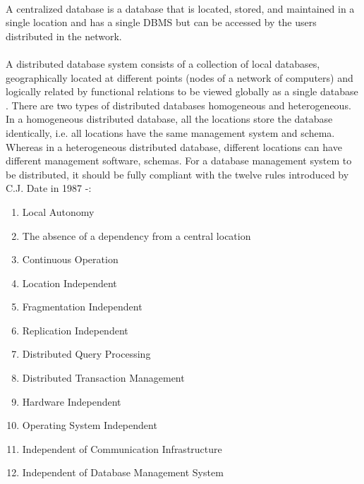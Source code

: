 \documentclass[12pt]{article}
\begin{document}
        \paragraph{}
        A centralized database is a database that is located, stored, and maintained in a single location and has a single DBMS but can be accessed by the users distributed in the network.
        \paragraph{}
        A distributed database system consists of a collection of local databases,  geographically located at different points (nodes of a network of computers) and  logically related by functional relations to be viewed globally as a single database \cite{distributeddatabase}.
        There are two types of distributed databases homogeneous and heterogeneous. In a homogeneous distributed database, all the locations store the database identically, i.e. all locations have the same management system and schema. Whereas in a heterogeneous distributed database, different locations can have different management software, schemas.
        For a database management system to be distributed, it should be fully compliant with the twelve rules introduced by C.J. Date in 1987 \cite{distributeddbms} -:
        \begin{enumerate}
            \item Local Autonomy
            \item The absence of a dependency from a central location
            \item Continuous Operation
            \item Location Independent
            \item Fragmentation Independent
            \item Replication  Independent
            \item Distributed Query Processing
            \item Distributed Transaction Management
            \item Hardware Independent
            \item Operating System Independent
            \item Independent of Communication  Infrastructure
            \item Independent of Database Management System
        \end{enumerate}
        
\end{document}
